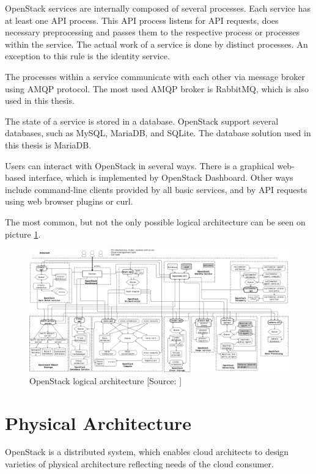 OpenStack services are internally composed of several processes. Each service has at least one API process. This API process listens for API requests, does necessary preprocessing and passes them to the respective process or processes within the service. The actual work of a service is done by distinct processes. An exception to this rule is the identity service.

The processes within a service communicate with each other via message broker using AMQP protocol. The most used AMQP broker is RabbitMQ, which is also used in this thesis.

The state of a service is stored in a database. OpenStack support several databases, such as MySQL, MariaDB, and SQLite. The database solution used in this thesis is MariaDB. \cite{AdminGuide}

Users can interact with OpenStack in several ways. There is a graphical web-based interface, which is implemented by OpenStack Dashboard. Other ways include command-line clients provided by all basic services, and by API requests using web browser plugins or curl.

The most common, but not the only possible logical architecture can be seen on picture \ref{fig:openstack_logical_arch}.

\begin{figure}[!h]
  \includegraphics[width=\textwidth]{fig/openstack_logical_architecture.png}
  \caption{OpenStack logical architecture [Source: \cite{logicalArch}]}
  \label{fig:openstack_logical_arch}
\end{figure}

\section{Physical Architecture}
OpenStack is a distributed system, which enables cloud architects to design varieties of physical architecture reflecting needs of the cloud consumer.

